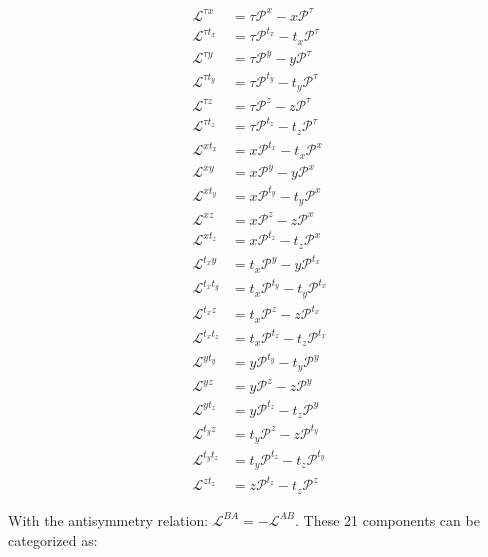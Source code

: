 \documentclass{article}
\begin{document}
\begin{align}
\mathcal{L}^{\tau x} &= \tau \mathcal{P}^x - x \mathcal{P}^\tau \\
\mathcal{L}^{\tau t_x} &= \tau \mathcal{P}^{t_x} - t_x \mathcal{P}^\tau \\
\mathcal{L}^{\tau y} &= \tau \mathcal{P}^y - y \mathcal{P}^\tau \\
\mathcal{L}^{\tau t_y} &= \tau \mathcal{P}^{t_y} - t_y \mathcal{P}^\tau \\
\mathcal{L}^{\tau z} &= \tau \mathcal{P}^z - z \mathcal{P}^\tau \\
\mathcal{L}^{\tau t_z} &= \tau \mathcal{P}^{t_z} - t_z \mathcal{P}^\tau \\
\mathcal{L}^{x t_x} &= x \mathcal{P}^{t_x} - t_x \mathcal{P}^x \\
\mathcal{L}^{xy} &= x \mathcal{P}^y - y \mathcal{P}^x \\
\mathcal{L}^{x t_y} &= x \mathcal{P}^{t_y} - t_y \mathcal{P}^x \\
\mathcal{L}^{xz} &= x \mathcal{P}^z - z \mathcal{P}^x \\
\mathcal{L}^{x t_z} &= x \mathcal{P}^{t_z} - t_z \mathcal{P}^x \\
\mathcal{L}^{t_x y} &= t_x \mathcal{P}^y - y \mathcal{P}^{t_x} \\
\mathcal{L}^{t_x t_y} &= t_x \mathcal{P}^{t_y} - t_y \mathcal{P}^{t_x} \\
\mathcal{L}^{t_x z} &= t_x \mathcal{P}^z - z \mathcal{P}^{t_x} \\
\mathcal{L}^{t_x t_z} &= t_x \mathcal{P}^{t_z} - t_z \mathcal{P}^{t_x} \\
\mathcal{L}^{y t_y} &= y \mathcal{P}^{t_y} - t_y \mathcal{P}^y \\
\mathcal{L}^{yz} &= y \mathcal{P}^z - z \mathcal{P}^y \\
\mathcal{L}^{y t_z} &= y \mathcal{P}^{t_z} - t_z \mathcal{P}^y \\
\mathcal{L}^{t_y z} &= t_y \mathcal{P}^z - z \mathcal{P}^{t_y} \\
\mathcal{L}^{t_y t_z} &= t_y \mathcal{P}^{t_z} - t_z \mathcal{P}^{t_y} \\
\mathcal{L}^{z t_z} &= z \mathcal{P}^{t_z} - t_z \mathcal{P}^z
\end{align}

With the antisymmetry relation: $\mathcal{L}^{BA} = -\mathcal{L}^{AB}$. These 21 components can be categorized as:
\end{document}
